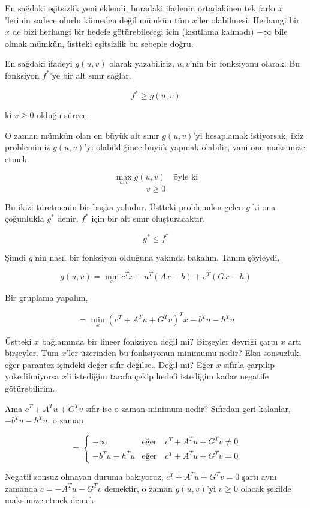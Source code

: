 \documentclass[12pt,fleqn]{article}\usepackage{../../common}
\begin{document}
En sağdaki eşitsizlik yeni eklendi, buradaki ifadenin ortadakinen tek farkı
$x$'lerinin sadece olurlu kümeden değil mümkün tüm $x$'ler
olabilmesi. Herhangi bir $x$ de bizi herhangi bir hedefe götürebilecegi
icin (kısıtlama kalmadı) $-\infty$ bile olmak mümkün, üstteki eşitsizlik bu
sebeple doğru.

En sağdaki ifadeyi $g(u,v)$ olarak yazabiliriz, $u,v$'nin bir
fonksiyonu olarak. Bu fonksiyon $f^\ast$'ye bir alt sınır sağlar, 

$$
f^\ast \ge g(u,v)
$$

ki $v \ge 0$ olduğu sürece. 

O zaman mümkün olan en büyük alt sınır $g(u,v)$'yi hesaplamak istiyorsak,
ikiz problemimiz $g(u,v)$'yi olabildiğince büyük yapmak olabilir, yani onu
maksimize etmek. 

$$
\max_{u,v} g(u,v) \quad \textrm{öyle ki}
$$
$$
v \ge 0
$$

Bu ikizi türetmenin bir başka yoludur. Üstteki problemden gelen $g$ ki ona
çoğunlukla $g^\ast$ denir, $f^\ast$ için bir alt sınır oluşturacaktır,

$$
g^\ast \le f^\ast
$$

Şimdi $g$'nin nasıl bir fonksiyon olduğuna yakında bakalım. Tanım şöyleydi,

$$
g(u,v) = \min_x c^T x + u^T (Ax-b) + v^T (Gx-h)
$$

Bir gruplama yapalım,

$$
= \min_x (c^T + A^Tu + G^T v)^T x - b^T u - h^Tu
$$

Üstteki $x$ bağlamında bir lineer fonksiyon değil mi? Birşeyler devriği
çarpı $x$ artı birşeyler. Tüm $x$'ler üzerinden bu fonksiyonun minimumu
nedir? Eksi sonsuzluk, eğer parantez içindeki değer sıfır değilse.. Değil
mi? Eğer $x$ sıfırla çarpılıp yokedilmiyorsa $x$'i istediğim tarafa çekip
hedefi istediğim kadar negatife götürebilirim.

Ama $c^T + A^Tu + G^T v$ sıfır ise o zaman minimum nedir? Sıfırdan geri
kalanlar, $- b^T u - h^Tu$, o zaman 

$$
= \left\{ \begin{array}{ll}
-\infty & \text{eğer} \quad c^T + A^Tu + G^T v \ne 0 \\
- b^T u - h^Tu & \text{eğer} \quad c^T + A^Tu + G^T v = 0 
\end{array} \right.
$$

Negatif sonsuz olmayan duruma bakıyoruz, $c^T + A^Tu + G^T v = 0 $ şartı
aynı zamanda $c = -A^Tu - G^T v $ demektir, o zaman $g(u,v)$'yi
$v \ge 0$ olacak şekilde maksimize etmek demek
\end{document}
